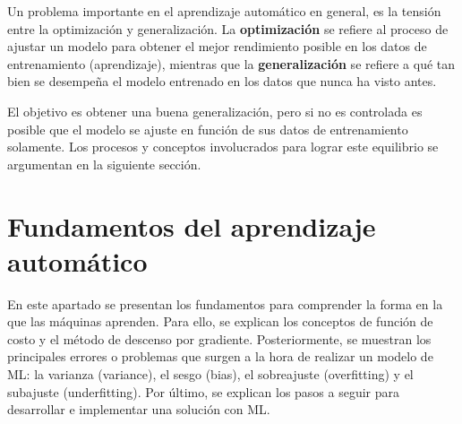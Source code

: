  
 
 
 Un problema importante en el aprendizaje automático en general, es la tensión entre la optimización y generalización. La \textbf{optimización} se refiere al proceso de ajustar un modelo para obtener el mejor rendimiento posible en los datos de entrenamiento (aprendizaje), mientras que la \textbf{generalización} se refiere a qué tan bien se desempeña el modelo entrenado en los datos que nunca ha visto antes. 
 
 El objetivo es obtener una buena generalización, pero si no es controlada es posible que el modelo se ajuste en función de sus datos de entrenamiento solamente. Los procesos y conceptos involucrados para lograr este equilibrio se argumentan en la siguiente sección.
 
 
 \section{Fundamentos del aprendizaje automático}
 
 En este apartado se presentan los fundamentos para comprender la forma en la que las máquinas aprenden. Para ello, se explican los conceptos de función de costo y el método de descenso por gradiente. Posteriormente, se muestran los principales errores o problemas que surgen a la hora de realizar un modelo de ML: la varianza (variance), el sesgo (bias), el sobreajuste (overfitting) y el subajuste (underfitting). Por último, se explican los pasos a seguir para desarrollar e implementar una solución con ML.
 
